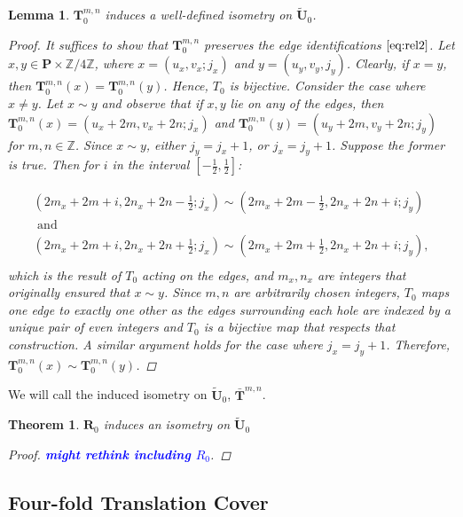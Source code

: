 \documentclass[]{article}
\newtheorem{thm}{Theorem}[subsection]
\newtheorem{lem}{Lemma}[subsection]
\newcommand{\compav}[1]{\textbf{\textcolor{blue}{#1}}}
\begin{document}
\begin{lem}$\mathbf{T}^{m,n}_{0}$ induces a well-defined isometry on $\tilde{\mathbf{U}}_0$.
\begin{proof}
It suffices to show that $\mathbf{T}^{m,n}_{0}$ preserves the edge identifications $\eqref{eq:rel2}$. Let $x,y\in\mathbf{P}\times\mathbb{Z}/4\mathbb{Z}$, where $x=(u_x,v_x;j_x)$ and $y=(u_y,v_y,j_y)$. Clearly, if $x=y$, then $\mathbf{T}^{m,n}_{0}(x)=\mathbf{T}^{m,n}_{0}(y)$. Hence, $T_0$ is bijective. Consider the case where $x\neq y$. Let $x\sim y$ and observe that if $x,y$ lie on any of the edges, then $\mathbf{T}^{m,n}_{0}(x)=(u_x+2m,v_x+2n;j_x)$ and $\mathbf{T}^{m,n}_{0}(y)=(u_y+2m,v_y+2n;j_y)$ for $m,n\in\mathbb{Z}$. Since $x\sim y$, either $j_y=j_x+1$, or $j_x=j_y+1$. Suppose the former is true. Then for $i$ in the interval $[-\frac{1}{2},\frac{1}{2}]$:

\begin{equation*}
\begin{split}
(2m_x+2m+i, 2n_x+2n-\frac{1}{2};j_x)\sim(2m_x+2m-\frac{1}{2},2n_x+2n+i;j_y)\\\text{ and }\hspace{2in}\\
(2m_x+2m+i, 2n_x+2n+\frac{1}{2};j_x)\sim(2m_x+2m+\frac{1}{2},2n_x+2n+i;j_y),\\
\end{split}
\end{equation*}
which is the result of $T_0$ acting on the edges, and $m_x,n_x$ are integers that originally ensured that $x\sim y$. Since $m,n$ are arbitrarily chosen integers, $T_0$ maps one edge to exactly one other as the edges surrounding each hole are indexed by a unique pair of even integers and $T_0$  is a bijective map that respects that construction. A similar argument holds for the case where $j_x=j_y+1$. Therefore, $\mathbf{T}^{m,n}_{0}(x)\sim\mathbf{T}^{m,n}_{0}(y)$.
\end{proof}
\end{lem}

We will call the induced isometry on $\tilde{\mathbf{U}}_0$, $\bar{\mathbf{T}}^{m,n}$.

\begin{thm}$\mathbf{R}_{0}$ induces an isometry on $\tilde{\mathbf{U}}_0$
\begin{proof}
\compav{might rethink including $R_0$}.
\end{proof}
\end{thm}

\subsection{Four-fold Translation Cover}
\end{document}
